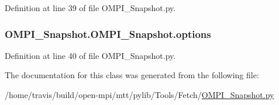 Definition at line 39 of file O\-M\-P\-I\-\_\-\-Snapshot.\-py.

\hypertarget{class_o_m_p_i___snapshot_1_1_o_m_p_i___snapshot_a1977ca5a7120bd199d1de101a0fb8c34}{
\subsubsection[{options}]{\setlength{\rightskip}{0pt plus 5cm}O\-M\-P\-I\-\_\-\-Snapshot.\-O\-M\-P\-I\-\_\-\-Snapshot.\-options}}\label{class_o_m_p_i___snapshot_1_1_o_m_p_i___snapshot_a1977ca5a7120bd199d1de101a0fb8c34}


Definition at line 40 of file O\-M\-P\-I\-\_\-\-Snapshot.\-py.



The documentation for this class was generated from the following file\-:\begin{DoxyCompactItemize}
\item 
/home/travis/build/open-\/mpi/mtt/pylib/\-Tools/\-Fetch/\hyperlink{_o_m_p_i___snapshot_8py}{O\-M\-P\-I\-\_\-\-Snapshot.\-py}\end{DoxyCompactItemize}
